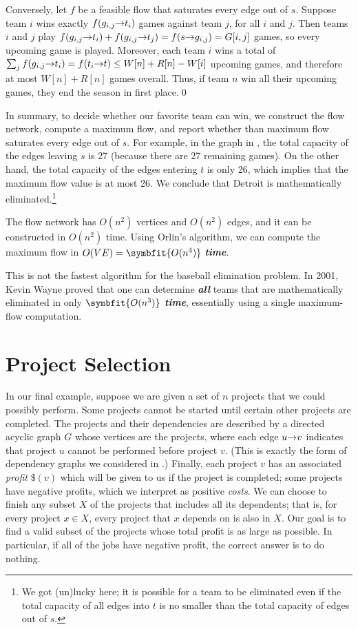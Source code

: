 Conversely, let $f$ be a feasible flow that saturates every edge out of $s$.
Suppose team $i$ wins exactly $f(g_{i,j}\mathord{\rightarrow}t_i)$ games against team $j$, for all $i$ and $j$.
Then teams $i$ and $j$ play $f(g_{i,j}\mathord{\rightarrow}t_i) + f(g_{i,j}\mathord{\rightarrow}t_j) = f(s\mathord{\rightarrow}g_{i,j}) = G[i,j]$ games, so every upcoming game is played.
Moreover, each team $i$ wins a total of $\sum_j f(g_{i,j}\mathord{\rightarrow}t_i) = f(t_i\mathord{\rightarrow}t) \le W[n]+R[n]-W[i]$ upcoming games, and therefore at most $W[n] + R[n]$ games overall.
Thus, if team $n$ win all their upcoming games, they end the season in first place.\qed

In summary, to decide whether our favorite team can win, we construct the flow network, compute a maximum flow, and report whether than maximum flow saturates every edge out of $s$.
For example, in the graph in , the total capacity of the edges leaving $s$ is 27 (because there are 27 remaining games).
On the other hand, the total capacity of the edges entering $t$ is only 26, which implies that the maximum flow value is at most 26.
We conclude that Detroit is mathematically eliminated.\footnote{We got (un)lucky here; it is possible for a team to be eliminated even if the total capacity of all edges into $t$ is no smaller than the total capacity of edges out of $s$.}

The flow network has $O(n^2)$ vertices and $O(n^2)$ edges, and it can be constructed in $O(n^2)$ time.
Using Orlin’s algorithm, we can compute the maximum flow in $O(VE) = \symbfit{O(n^4)}$ \textbf{\textit{time}}.

This is not the fastest algorithm for the baseball elimination problem.
In 2001, Kevin Wayne proved that one can determine \textbf{\textit{all}} teams that are mathematically eliminated in only $\symbfit{O(n^3)}$ \textbf{\textit{time}}, essentially using a single maximum-flow computation.

\section{Project Selection}
\label{sec:11.7}

In our final example, suppose we are given a set of $n$ projects that we could possibly perform.
Some projects cannot be started until certain other projects are completed.
The projects and their dependencies are described by a directed acyclic graph $G$ whose vertices are the projects, where each edge $u\mathord{\rightarrow}v$ indicates that project $u$ cannot be performed before project $v$.
(This is exactly the form of dependency graphs we considered in .)
Finally, each project $v$ has an associated \textit{profit} $\$(v)$ which will be given to us if the project is completed; some projects have negative profits, which we interpret as positive \textit{costs}.
We can choose to finish any subset $X$ of the projects that includes all its dependents; that is, for every project $x \in X$, every project that $x$ depends on is also in $X$.
Our goal is to find a valid subset of the projects whose total profit is as large as possible.
In particular, if all of the jobs have negative profit, the correct answer is to do nothing.

